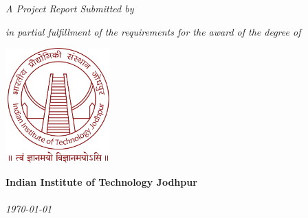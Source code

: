 \begin{titlepage}
\begin{center}
\begin{flushright}
\Huge{\textbf{{\ttitle}}
\end{flushright}
\vfill
\begin{flushright}
\large{\emph{A Project Report Submitted by}}\\
\huge{\textbf{\authorname}}
\end{flushright}
\vfill
\begin{flushright}
\large{{\emph{in partial fulfillment of the requirements for the award of the degree of}}}\\
\huge{\textbf{\degree}}
\end{flushright}
\vfill
\includegraphics[width=0.3\textwidth,right]{Figures/IITJlogo.jpg}
\begin{flushright}
\Large{\textbf{Indian Institute of Technology Jodhpur}}\\
\Large{\textbf{\deptname}}\\
\Large{\emph{\monthyeardate\today}}
\end{flushright}


  

 
\end{center}
\end{titlepage}
